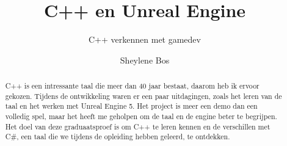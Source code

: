 \documentclass[a0,portrait]{hogent-poster}
\title{C++ en Unreal Engine}
\subtitle{C++ verkennen met gamedev}
\author{Sheylene Bos}
\begin{document}
\maketitle

\begin{abstract}
C++ is een intressante taal die meer dan 40 jaar bestaat, daarom heb ik ervoor gekozen.
Tijdens de ontwikkeling waren er een paar uitdagingen, zoals het leren van de taal en het werken met Unreal Engine 5.
Het project is meer een demo dan een volledig spel, maar het heeft me geholpen om de taal en de engine beter te begrijpen.
Het doel van deze graduaatsproef is om C++ te leren kennen en de verschillen met C\#, een taal die we tijdens de opleiding hebben geleerd, te ontdekken.

\end{abstract}
\end{document}
